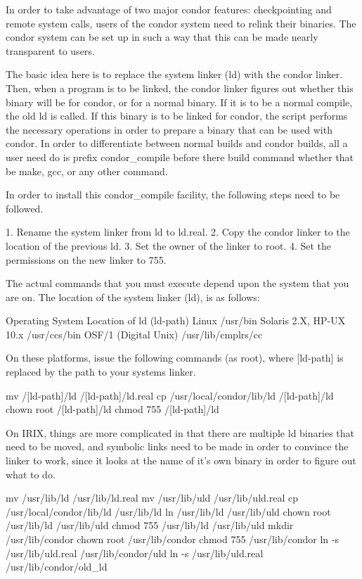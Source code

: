 In order to take advantage of two major condor features: checkpointing and
remote system calls, users of the condor system need to relink their
binaries.  The condor system can be set up in such a way that this can be made
nearly transparent to users.  

The basic idea here is to replace the system linker (ld) with the condor
linker.  Then, when a program is to be linked, the condor linker figures out
whether this binary will be for condor, or for a normal binary.  If it is to
be a normal compile, the old ld is called.  If this binary is to be linked for
condor, the script performs the necessary operations in order to prepare a
binary that can be used with condor.  In order to differentiate between normal
builds and condor builds, all a user need do is prefix condor_compile before
there build command whether that be make, gcc, or any other command.

In order to install this condor_compile facility, the following steps need
to be followed.
	
	1. Rename the system linker from ld to ld.real.
	2. Copy the condor linker to the location of the previous ld.
	3. Set the owner of the linker to root.
	4. Set the permissions on the new linker to 755.

The actual commands that you must execute depend upon the system that you
are on.  The location of the system linker (ld), is as follows:

	Operating System              Location of ld (ld-path)
	Linux                         /usr/bin
	Solaris 2.X, HP-UX 10.x       /usr/ccs/bin
	OSF/1 (Digital Unix)          /usr/lib/cmplrs/cc

On these platforms, issue the following commands (as root), where [ld-path] is
replaced by the path to your systems linker.

	mv /[ld-path]/ld /[ld-path]/ld.real
        cp /usr/local/condor/lib/ld /[ld-path]/ld
        chown root /[ld-path]/ld
        chmod 755 /[ld-path]/ld

On IRIX, things are more complicated in that there are multiple ld binaries
that need to be moved, and symbolic links need to be made in order to convince
the linker to work, since it looks at the name of it's own binary in order
to figure out what to do.

	mv /usr/lib/ld /usr/lib/ld.real
        mv /usr/lib/uld /usr/lib/uld.real
        cp /usr/local/condor/lib/ld /usr/lib/ld
        ln /usr/lib/ld /usr/lib/uld
        chown root /usr/lib/ld /usr/lib/uld
        chmod 755 /usr/lib/ld /usr/lib/uld
        mkdir /usr/lib/condor
        chown root /usr/lib/condor
        chmod 755 /usr/lib/condor
        ln -s /usr/lib/uld.real /usr/lib/condor/uld
        ln -s /usr/lib/uld.real /usr/lib/condor/old_ld

